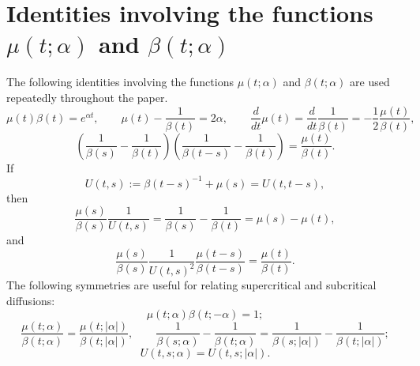 \documentclass[preprint,12pt]{elsarticle}
\begin{document}
\section{Identities involving the functions $\mu(t; \alpha)$ and $\beta(t; \alpha)$}
\label{sec:MuBetaIdentities}

The following identities involving the functions $\mu(t; \alpha)$ and $\beta(t; \alpha)$ are used repeatedly throughout the paper.  
\begin{equation}	\label{mubetaIdentity1}
\mu(t)\beta(t) = e^{\alpha t}, \qquad \mu(t) - \frac{1}{\beta(t)} = 2\alpha, \qquad \frac{d}{dt} \mu(t) = \frac{d}{dt} \frac{1}{\beta(t)} = -\frac{1}{2} \frac{\mu(t)}{\beta(t)},  
\end{equation}
\begin{equation*}	%
\left(\frac{1}{\beta(s)} - \frac{1}{\beta(t)}\right) \left(\frac{1}{\beta(t - s)} - \frac{1}{\beta(t)}\right) = \frac{\mu(t)}{\beta(t)}.
\end{equation*}
If 
\begin{equation}	\label{UtsDefn}
U(t, s) := \beta(t - s)^{-1} + \mu(s) = U(t, t - s), 
\end{equation}
then 
\begin{equation}	\label{UIdentity1}
\frac{\mu(s)}{\beta(s)}\frac{1}{U(t, s)} = \frac{1}{\beta(s)} - \frac{1}{\beta(t)} = \mu(s) - \mu(t), 
\end{equation}
and 
\begin{equation}	\label{UIdentity2}
\frac{\mu(s)}{\beta(s)}\frac{1}{U(t, s)^2}\frac{\mu(t - s)}{\beta(t - s)} = \frac{\mu(t)}{\beta(t)}. 
\end{equation}
The following symmetries are useful for relating supercritical and subcritical diffusions: 
 \begin{equation}	\label{mubetaIdentity3}
\mu(t; \alpha) \beta(t; -\alpha) = 1;
\end{equation}
\begin{equation}	\label{mubetaIdentity4}
\frac{\mu(t; \alpha)}{\beta(t; \alpha)} = \frac{\mu(t; |\alpha|)}{\beta(t; |\alpha|)}, \qquad 
	\frac{1}{\beta(s; \alpha)} - \frac{1}{\beta(t; \alpha)} = \frac{1}{\beta(s; |\alpha|)} - \frac{1}{\beta(t; |\alpha|)};  
\end{equation}
\begin{equation}	\label{UIdentity3}
U(t, s; \alpha) = U(t, s; |\alpha|).
\end{equation}

%
%
\end{document}
